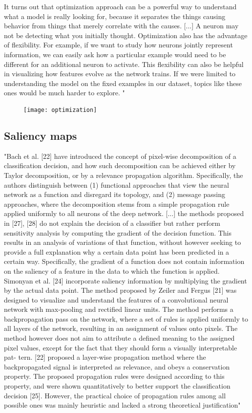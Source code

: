		It turns out that optimization approach can be a powerful way to understand what a model is really looking for, because it separates the things causing behavior from things that merely correlate with the causes. [...] A neuron may not be detecting what you initially thought. Optimization also has the advantage of ﬂexibility. For example, if we want to study how neurons jointly represent information, we can easily ask how a particular example would need to be different for an additional neuron to activate. This ﬂexibility can also be helpful in visualizing how features evolve as the network trains. If we were limited to understanding the model on the ﬁxed examples in our dataset, topics like these ones would be much harder to explore. " \cite{Olah2017}
		\begin{figure}[h]
			\centering
			\texttt{[image: optimization]}
		\end{figure}
	
	\subsection{Saliency maps}
	"Bach et al. [22] have introduced the concept of pixel-wise decomposition of a classification decision, and how such decomposition can be achieved either by Taylor decomposition, or by a relevance propagation algorithm. Specifically, the authors distinguish between (1) functional approaches that view the neural network as a function and disregard its topology, and (2) message passing approaches, where the decomposition stems from a simple propagation rule applied uniformly to all neurons of the deep network.
	[...]
	the methods proposed in [27], [28] do not explain the decision of a classifier but rather perform sensitivity analysis by computing the gradient of the decision function. This results in an analysis of variations of that function, without however seeking to provide a full explanation why a certain data point has been predicted in a certain way. Specifically, the gradient of a function does not contain information on the saliency of a feature in the data to which the function is applied. Simonyan et al. [24] incorporate saliency information by multiplying the gradient by the actual data point.
	The method proposed by Zeiler and Fergus [21] was designed to visualize and understand the features of a convolutional neural network with max-pooling and rectified linear units. The method performs a backpropagation pass on the network, where a set of rules is applied uniformly to all layers of the network, resulting in an assignment of values onto pixels. The method however does not aim to attribute a defined meaning to the assigned pixel values, except for the fact that they should form a visually interpretable pat- tern. [22] proposed a layer-wise propagation method where the backpropagated signal is interpreted as relevance, and obeys a conservation property. The proposed propagation rules were designed according to this property, and were shown quantitatively to better support the classification decision [25]. However, the practical choice of propagation rules among all possible ones was mainly heuristic and lacked a strong theoretical justification" \cite{Montavon2017}
	
